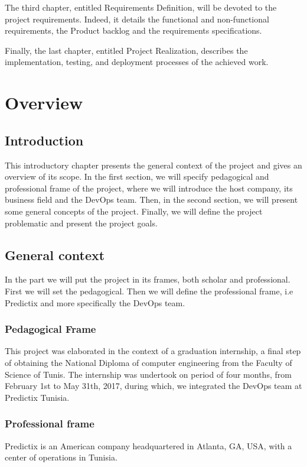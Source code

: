 The third chapter, entitled Requirements Definition, will be devoted to the
project requirements. Indeed, it details the functional and non-functional
requirements, the Product backlog and the requirements specifications.

Finally, the last chapter, entitled Project Realization, describes the
implementation, testing, and deployment processes of the achieved work.

\chapter{Overview}

\section*{Introduction}
This introductory chapter presents the general context of the project and gives
an overview of its scope. In the first section, we will specify pedagogical and
professional frame of the project, where we will introduce the host company, its
business field  and the DevOps team. Then, in the second section, we will
present some general concepts of the project. Finally, we will define the
project problematic and present the project goals.

\pagebreak

\section{General context}
In the part we will put the project in its frames, both scholar and
professional. First we will set the pedagogical. Then we will define the
professional frame, i.e Predictix and more specifically the DevOps team.

\subsection{Pedagogical Frame}
This project was elaborated in the context of a graduation internship, a final
step of obtaining the National Diploma of computer engineering from the Faculty
of Science of Tunis.
The internship was undertook on period of four months, from February 1st to May
31th, 2017, during which, we integrated the DevOps team at Predictix Tunisia.
\subsection{Professional frame}

Predictix is an American company headquartered in Atlanta, GA, USA, with a
center of operations in Tunisia.
